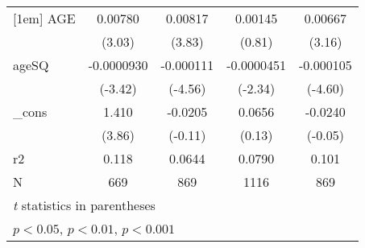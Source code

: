 \begin{table}[htbp]
\begin{tabular}{l*{4}{c}}
[1em]
AGE         &     0.00780\sym{**} &     0.00817\sym{***}&     0.00145         &     0.00667\sym{**} \\
            &      (3.03)         &      (3.83)         &      (0.81)         &      (3.16)         \\
[1em]
ageSQ       &  -0.0000930\sym{***}&   -0.000111\sym{***}&  -0.0000451\sym{*}  &   -0.000105\sym{***}\\
            &     (-3.42)         &     (-4.56)         &     (-2.34)         &     (-4.60)         \\
[1em]
\_cons      &       1.410\sym{***}&     -0.0205         &      0.0656         &     -0.0240         \\
            &      (3.86)         &     (-0.11)         &      (0.13)         &     (-0.05)         \\
\hline
r2          &       0.118         &      0.0644         &      0.0790         &       0.101         \\
N           &         669         &         869         &        1116         &         869         \\
\hline\hline
\multicolumn{5}{l}{\footnotesize \textit{t} statistics in parentheses}\\
\multicolumn{5}{l}{\footnotesize \sym{*} \(p<0.05\), \sym{**} \(p<0.01\), \sym{***} \(p<0.001\)}\\
\end{tabular}
\end{table}
